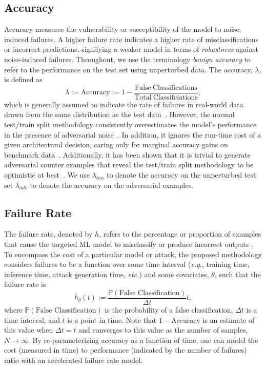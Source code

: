 \documentclass[conference]{IEEEtran}
\begin{document}
\subsection{Accuracy}
\label{acc}
  Accuracy measures the vulnerability or susceptibility of the model to noise-induced failures. A higher failure rate indicates a higher rate of misclassifications or incorrect predictions, signifying a weaker model in terms of \textit{robustness} against noise-induced failures. Throughout, we use the terminology \textit{benign accuracy} to refer to the performance on the test set using unperturbed data. The accuracy, $\lambda$, is defined as
\begin{equation}
    \lambda:= \mathrm{Accuracy} := 1 - \frac{\mathrm{False~Classifications}}{\mathrm{Total~Classifciations}},
    \label{eq:acc}
\end{equation}
which is generally assumed to indicate the rate of failures in real-world data drawn from the same distribution as the test data~\cite{tan2021critical}. However, the normal test/train split methodology consistently overestimates the model's performance in the presence of adversarial noise~\cite{croce_reliable_2020}. In addition, it ignores the run-time cost of a given architectural decision, caring only for marginal accuracy gains on benchmark data~\cite{desislavov2021compute,bailly2022effects}. Additionally, it has been shown that it is trivial to generate adversarial counter examples that reveal the test/train split methodology to be optimistic at best~\cite{carlini_towards_2017,adversarialpatch,pixelattack,hopskipjump,biggio_poisoning_2013,chakraborty_adversarial_2018,dohmatob_generalized_2019,meyers}. We use $\lambda_{ben}$ to denote the accuracy on the unperturbed test set $\lambda_{adv}$ to denote the accuracy on the adversarial examples.

\subsection{Failure Rate}
\label{failure_rate}
The failure rate, denoted by $h$, refers to the percentage or proportion of examples that cause the targeted ML model to misclassify or produce incorrect outputs \cite{meyers}. To encompass the cost of a particular model or attack, the proposed methodology considers failures to be a function over some time interval (\textit{e.g.}, training time, inference time, attack generation time, \textit{etc.}) and some covariates, $\theta$, such that the failure rate is
\[
    h_{ \theta}(t) :=  \frac{\mathbb{P}(\textrm{False~Classification})}{\Delta t} t,
\]
where $\mathbb{P}(\textrm{False~Classification})$ is the probability of a false classification, $\Delta t$ is a time interval, and $t$ is a point in time. Note that  $1 - \text{Accuracy}$  is an estimate of this value when $\Delta t = t$ and converges to this value as the number of samples, $N \rightarrow \infty$. By re-parameterizing accuracy as a function of time, one can model the cost (measured in time) to performance (indicated by the number of failures) ratio with an accelerated failure rate model.
\end{document}
